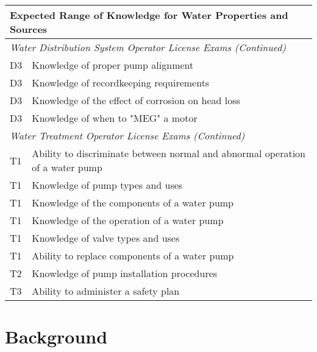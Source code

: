 \begin{table}[H]
\begin{tabular}{| m{1cm} |m{15cm} |}
\hline
\multicolumn{2}{|l|}{\textbf{Expected   Range of Knowledge for Water Properties and Sources}}                                                                      \\ \hline
\multicolumn{2}{|l|}{\textit{Water   Distribution System Operator License Exams (Continued)}}                                                                  \\ \hline
D3 & Knowledge of proper   pump alignment                                            \\ \hline
D3 & Knowledge of   recordkeeping requirements                                       \\ \hline
D3 & Knowledge of the   effect of corrosion on head loss                             \\ \hline
D3 & Knowledge of when to   "MEG" a motor                                            \\ \hline
\multicolumn{2}{|l|}{\textit{Water   Treatment Operator License Exams (Continued)}}                                                                  \\ \hline
T1 & Ability to   discriminate between normal and abnormal operation of a water pump \\ \hline
T1 & Knowledge of pump   types and uses                                              \\ \hline
T1 & Knowledge of the   components of a water pump                                   \\ \hline
T1 & Knowledge of the   operation of a water pump                                    \\ \hline
T1 & Knowledge of valve   types and uses                                             \\ \hline
T1 & Ability to replace   components of a water pump                                 \\ \hline
T2 & Knowledge of pump   installation procedures                                     \\ \hline
T3 & Ability to administer   a safety plan                                           \\ \hline
\end{tabular}
\end{table}
\newpage



\section{Background}

